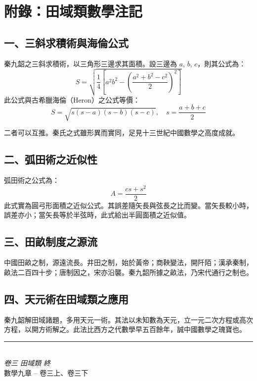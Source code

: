 \documentclass[11pt,a4paper]{article}
\begin{document}
\section*{附錄：田域類數學注記}

\subsection*{一、三斜求積術與海倫公式}

秦九韶之三斜求積術，以三角形三邊求其面積。設三邊為 $a$, $b$, $c$，則其公式為：
\[
S = \sqrt{\frac{1}{4}\left[a^2b^2 - \left(\frac{a^2+b^2-c^2}{2}\right)^2\right]}
\]
此公式與古希臘海倫（Heron）之公式等價：
\[
S = \sqrt{s(s-a)(s-b)(s-c)}, \quad s = \frac{a+b+c}{2}
\]

二者可以互推。秦氏之式雖形異而實同，足見十三世紀中國數學之高度成就。

\subsection*{二、弧田術之近似性}

弧田術之公式為：
\[
A = \frac{cs + s^2}{2}
\]
此式實為圓弓形面積之近似公式。其誤差隨矢長與弦長之比而變。當矢長較小時，誤差亦小；當矢長等於半弦時，此式給出半圓面積之近似值。

\subsection*{三、田畝制度之源流}

中國田畝之制，源遠流長。井田之制，始於黃帝；商鞅變法，開阡陌；漢承秦制，畝法二百四十步；唐制因之，宋亦沿襲。秦九韶所據之畝法，乃宋代通行之制也。

\subsection*{四、天元術在田域類之應用}

秦九韶解田域諸題，多用天元一術。其法以未知數為天元，立一元二次方程或高次方程，以開方術解之。此法比西方之代數學早五百餘年，誠中國數學之瑰寶也。

\vspace{1cm}

\begin{center}
{\color{rulecolor}\rule{8cm}{0.4pt}}\\[0.5cm]
{\small\textit{卷三 田域類 終}}\\[0.3cm]
{\small 數學九章 -- 卷三上、卷三下}
\end{center}
\end{document}

